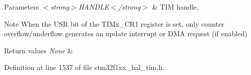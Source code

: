\begin{DoxyParams}{Parameters}
{\em $<$strong$>$\+H\+A\+N\+D\+L\+E$<$/strong$>$} & T\+IM handle. \\
\hline
\end{DoxyParams}
\begin{DoxyNote}{Note}
When the U\+SR bit of the T\+I\+Mx\+\_\+\+C\+R1 register is set, only counter overflow/underflow generates an update interrupt or D\+MA request (if enabled) 
\end{DoxyNote}

\begin{DoxyRetVals}{Return values}
{\em None} & \\
\hline
\end{DoxyRetVals}


Definition at line 1537 of file stm32f1xx\+\_\+hal\+\_\+tim.\+h.


